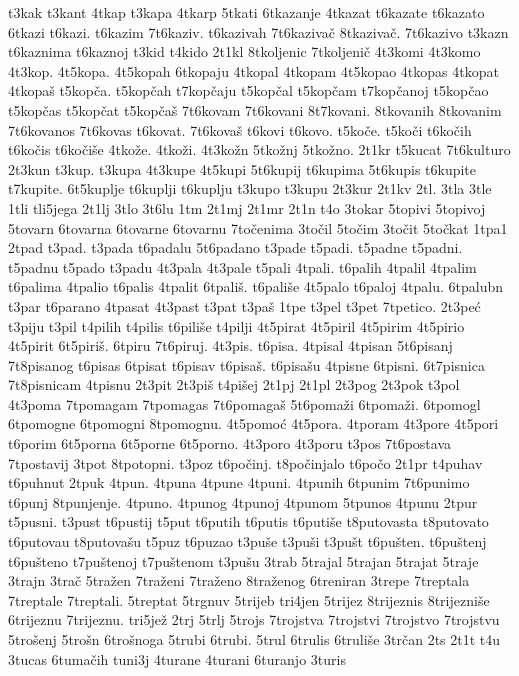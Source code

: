 {t3kak
t3kant
4tkap
t3kapa
4tkarp
5tkati
6tkazanje
4tkazat
t6kazate
t6kazato
6tkazi
t6kazi.
t6kazim
7t6kaziv.
t6kazivah
7t6kazivač
8tkazivač.
7t6kazivo
t3kazn
t6kaznima
t6kaznoj
t3kid
t4kido
2t1kl
8tkoljenic
7tkoljenič
4t3komi
4t3komo
4t3kop.
4t5kopa.
4t5kopah
6tkopaju
4tkopal
4tkopam
4t5kopao
4tkopas
4tkopat
4tkopaš
t5kopča.
t5kopčah
t7kopčaju
t5kopčal
t5kopčam
t7kopčanoj
t5kopčao
t5kopčas
t5kopčat
t5kopčaš
7t6kovam
7t6kovani
8t7kovani.
8tkovanih
8tkovanim
7t6kovanos
7t6kovas
t6kovat.
7t6kovaš
t6kovi
t6kovo.
t5koče.
t5koči
t6kočih
t6kočis
t6kočiše
4tkože.
4tkoži.
4t3kožn
5tkožnj
5tkožno.
2t1kr
t5kucat
7t6kulturo
2t3kun
t3kup.
t3kupa
4t3kupe
4t5kupi
5t6kupij
t6kupima
5t6kupis
t6kupite
t7kupite.
6t5kuplje
t6kuplji
t6kuplju
t3kupo
t3kupu
2t3kur
2t1kv
2tl.
3tla
3tle
1tli
tli5jega
2t1lj
3tlo
3t6lu
1tm
2t1mj
2t1mr
2t1n
t4o
3tokar
5topivi
5topivoj
5tovarn
6tovarna
6tovarne
6tovarnu
7točenima
3točil
5točim
3točit
5točkat
1tpa1
2tpad
t3pad.
t3pada
t6padalu
5t6padano
t3pade
t5padi.
t5padne
t5padni.
t5padnu
t5pado
t3padu
4t3pala
4t3pale
t5pali
4tpali.
t6palih
4tpalil
4tpalim
t6palima
4tpalio
t6palis
4tpalit
6tpališ.
t6pališe
4t5palo
t6paloj
4tpalu.
6tpalubn
t3par
t6parano
4tpasat
4t3past
t3pat
t3paš
1tpe
t3pel
t3pet
7tpetico.
2t3peć
t3piju
t3pil
t4pilih
t4pilis
t6piliše
t4pilji
4t5pirat
4t5piril
4t5pirim
4t5pirio
4t5pirit
6t5piriš.
6tpiru
7t6piruj.
4t3pis.
t6pisa.
4tpisal
4tpisan
5t6pisanj
7t8pisanog
t6pisas
6tpisat
t6pisav
t6pisaš.
t6pisašu
4tpisne
6tpisni.
6t7pisnica
7t8pisnicam
4tpisnu
2t3pit
2t3piš
t4pišej
2t1pj
2t1pl
2t3pog
2t3pok
t3pol
4t3poma
7tpomagam
7tpomagas
7t6pomagaš
5t6pomaži
6tpomaži.
6tpomogl
6tpomogne
6tpomogni
8tpomognu.
4t5pomoć
4t5pora.
4tporam
4t3pore
4t5pori
t6porim
6t5porna
6t5porne
6t5porno.
4t3poro
4t3poru
t3pos
7t6postava
7tpostavij
3tpot
8tpotopni.
t3poz
t6počinj.
t8počinjalo
t6počo
2t1pr
t4puhav
t6puhnut
2tpuk
4tpun.
4tpuna
4tpune
4tpuni.
4tpunih
6tpunim
7t6punimo
t6punj
8tpunjenje.
4tpuno.
4tpunog
4tpunoj
4tpunom
5tpunos
4tpunu
2tpur
t5pusni.
t3pust
t6pustij
t5put
t6putih
t6putis
t6putiše
t8putovasta
t8putovato
t6putovau
t8putovašu
t5puz
t6puzao
t3puše
t3puši
t3pušt
t6pušten.
t6puštenj
t6pušteno
t7puštenoj
t7puštenom
t3pušu
3trab
5trajal
5trajan
5trajat
5traje
3trajn
3trač
5tražen
7traženi
7traženo
8traženog
6treniran
3trepe
7treptala
7treptale
7treptali.
5treptat
5trgnuv
5trijeb
tri4jen
5trijez
8trijeznis
8trijezniše
6trijeznu
7trijeznu.
tri5jež
2trj
5trlj
5trojs
7trojstva
7trojstvi
7trojstvo
7trojstvu
5trošenj
5trošn
6trošnoga
5trubi
6trubi.
5trul
6trulis
6truliše
3trčan
2ts
2t1t
t4u
3tucas
6tumačih
tuni3j
4turane
4turani
6turanjo
3turis
}
